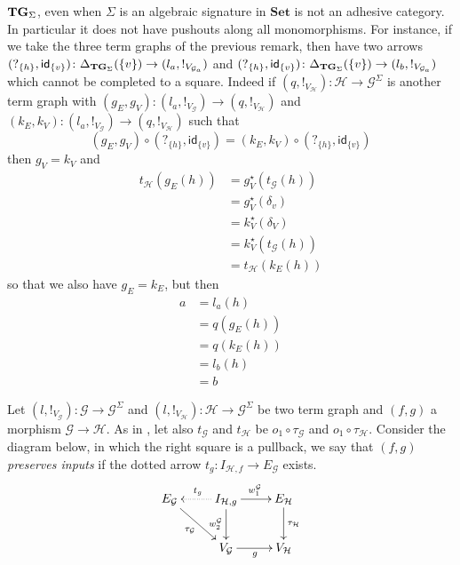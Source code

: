 \documentclass[runningheads,envcountsect]{llncs}
\newcommand{\Set}{\mathbf{Set}}
\newcommand{\catname}[1]{\textbf{\textup{#1}}}
\newcommand{\tg}[0]{\catname{TG}_{\Sigma}}
\newcommand{\id}[1]{\mathsf{id}_{#1}}
\begin{document}
\begin{remark}
	$\tg$, even when $\Sigma$ is an algebraic signature in $\Set$ is not an adhesive category. In particular it does not have pushouts along all monomorphisms. For instance, if we take the three term graphs of the previous remark, then have two arrows
	$(?_{\{h\}}, \id{\{v\}})\colon \Delta_{\tg}(\{v\})\to (l_a, !_{V_{\mathcal{G}_a}})$ and $(?_{\{h\}}, \id{\{v\}})\colon \Delta_{\tg}(\{v\})\to (l_b, !_{V_{\mathcal{G}_a}})$ which cannot be completed to a square. Indeed if $(q, !_{V_\mathcal{H}})\colon \mathcal{H}\to \mathcal{G}^\Sigma$ is another term graph with $(g_E, g_V)\colon (l_a, !_{V_{\mathcal{G}}})\to (q, !_{V_\mathcal{H}})$ and $(k_E, k_V)\colon (l_a, !_{V_{\mathcal{G}}})\to (q, !_{V_\mathcal{H}})$  such that 
	\[(g_E, g_V)\circ (?_{\{h\}}, \id{\{v\}}) = (k_E, k_V)\circ (?_{\{h\}}, \id{\{v\}})\]
	then $g_V=k_V$ and
	\begin{align*}t_{\mathcal{H}}(g_E(h))&=g^\star_V(t_{\mathcal{G}}(h))\\&=g_V^\star(\delta_v)\\&=k^\star_V(\delta_V)\\&=k^\star_V(t_{\mathcal{G}}(h))\\&=t_{\mathcal{H}}(k_E(h))
	\end{align*}
	so that we also have $g_E=k_E$, but then
	\begin{align*}
		a&=l_a(h)\\&=q(g_E(h))\\&=q(k_E(h))\\&=l_b(h)\\&=b
	\end{align*}
\end{remark}


\begin{definition}
	Let $(l, !_{V_{\mathcal{G}}})\colon \mathcal{G}\to \mathcal{G}^{\Sigma}$ and $(l, !_{V_{\mathcal{H}}})\colon \mathcal{H}\to \mathcal{G}^{\Sigma}$ be two term graph and $(f,g)$ a morphism $\mathcal{G}\to \mathcal{H}$. As in , let also $t_{\mathcal{G}}$ and $t_{\mathcal{H}}$ be $o_{1}\circ \tau_\mathcal{G}$ and $o_1\circ \tau_{\mathcal{H}}$. Consider the diagram below, in which the right square is a pullback, we say that $(f,g)$ \emph{preserves inputs} if the dotted arrow  $t_g\colon I_{\mathcal{{H}}, f}\to E_{\mathcal{{G}}}$ exists.
	\[\xymatrix{E_{\mathcal{G}} \ar[dr]_{\tau_{\mathcal{G}}}&I_{\mathcal{H}, g} \ar@{.>}[l]_{t_g} \ar[r]^{w^{\mathcal{G}}_1} \ar[d]_{w^{\mathcal{G}}_2} & E_{\mathcal{H}} \ar[d]^{\tau_{\mathcal{H}}}\\ & V_{\mathcal{G}} \ar[r]_{g}  & V_{\mathcal{{H}}}}\]
	
	
\end{definition}
\end{document}
